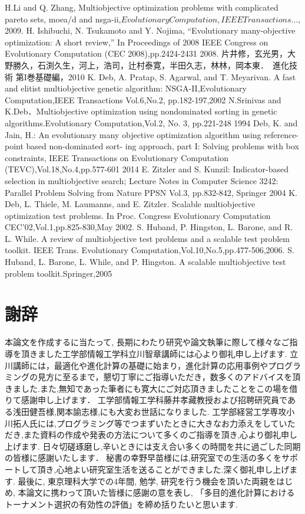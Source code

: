 \documentclass[12pt,a4j,notitlepage]{jreport}
\begin{document}
\begin{thebibliography}{99}
   H.Li and Q. Zhang, Multiobjective optimization problems with complicated pareto sets, moea/d and nsga-ii,$Evolutionary Computation, IEEE Transactions$..., 2009.
     H. Ishibuchi, N. Tsukamoto and Y. Nojima, “Evolutionary many-objective optimization: A short review,” In Proceedings of 2008 IEEE Congress on Evolutionary Computation (CEC 2008),pp.2424-2431 2008.
    片井修，玄光男，大野勝久，石渕久生，河上，浩司，辻村泰寛，半田久志，林林，岡本東．　進化技術 第I巻基礎編，2010
   K. Deb, A. Pratap, S. Agarwal, and T. Meyarivan. A fast and elitist multiobjective genetic algorithm: NSGA-II,Evolutionary Computation,IEEE Transactions Vol.6,No.2, pp.182-197,2002
  N.Srinivas and K.Deb．Multiobjective optimization using nondominated sorting in genetic algorithms.Evolutionary Computation,Vol.2, No. 3, pp.221-248 1994
   Deb, K. and Jain, H.: An evolutionary many objective optimization algorithm using reference-point based non-dominated sort- ing approach, part I: Solving problems with box constraints, IEEE Transactions on Evolutionary Computation (TEVC),Vol.18,No.4,pp.577-601 2014
  E. Zitzler and S. Kunzil: Indicator-based selection in multiobjective search; Lecture Notes in Computer Science 3242: Parallel Problem Solving from Nature PPSN Vol.3, pp.832-842, Springer 2004
 K. Deb, L. Thiele, M. Laumanns, and E. Zitzler. Scalable multiobjective optimization test problems. In Proc. Congress Evolutionary Computation CEC'02,Vol.1,pp.825-830,May 2002.
S. Huband, P. Hingston, L. Barone, and R. L. While. A review of multiobjective test problems and a scalable test problem toolkit. IEEE Trans. Evolutionary Computation,Vol.10,No.5,pp.477-506,2006.
S. Huband, L. Barone, L. While, and P. Hingston. A scalable multiobjective test problem toolkit.Springer,2005


   \end{thebibliography}


\chapter*{謝辞}
本論文を作成するに当たって, 長期にわたり研究や論文執筆に際して様々なご指導を頂きました工学部情報工学科立川智章講師には心より御礼申し上げます.
立川講師には，最適化や進化計算の基礎に始まり，進化計算の応用事例やプログラミングの見方に至るまで，懇切丁寧にご指導いただき，数多くのアドバイスを頂きました.また,無知であった筆者にも寛大にご対応頂きましたことをこの場を借りて感謝申し上げます．
工学部情報工学科藤井孝藏教授および招聘研究員である浅田健吾様,関本諭志様,にも大変お世話になりました.
工学部経営工学専攻小川拓人氏には,プログラミング等でつまずいたときに大きなお力添えをしていただき,また資料の作成や発表の方法について多くのご指導を頂き,心より御礼申し上げます.
日々切磋琢磨し,辛いときには支え合い多くの時間を共に過ごした同期の皆様に感謝いたします．
秘書の幸野早苗様には,研究室での生活の多くをサポートして頂き,心地よい研究室生活を送ることができました.深く御礼申し上げます.
最後に, 東京理科大学での4年間, 勉学, 研究を行う機会を頂いた両親をはじめ, 本論文に携わって頂いた皆様に感謝の意を表し, 「多目的進化計算におけるトーナメント選択の有効性の評価」を締め括りたいと思います.
\end{document}

